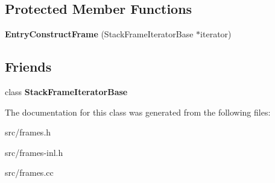 \subsection*{Protected Member Functions}
\begin{DoxyCompactItemize}
\item 
\hypertarget{classv8_1_1internal_1_1_entry_construct_frame_a31ed14256685bf54ecc3285b5f537dc3}{}{\bfseries Entry\+Construct\+Frame} (Stack\+Frame\+Iterator\+Base $\ast$iterator)\label{classv8_1_1internal_1_1_entry_construct_frame_a31ed14256685bf54ecc3285b5f537dc3}

\end{DoxyCompactItemize}
\subsection*{Friends}
\begin{DoxyCompactItemize}
\item 
\hypertarget{classv8_1_1internal_1_1_entry_construct_frame_ac7310421866976ca454bbe11c5f926c3}{}class {\bfseries Stack\+Frame\+Iterator\+Base}\label{classv8_1_1internal_1_1_entry_construct_frame_ac7310421866976ca454bbe11c5f926c3}

\end{DoxyCompactItemize}


The documentation for this class was generated from the following files\+:\begin{DoxyCompactItemize}
\item 
src/frames.\+h\item 
src/frames-\/inl.\+h\item 
src/frames.\+cc\end{DoxyCompactItemize}
